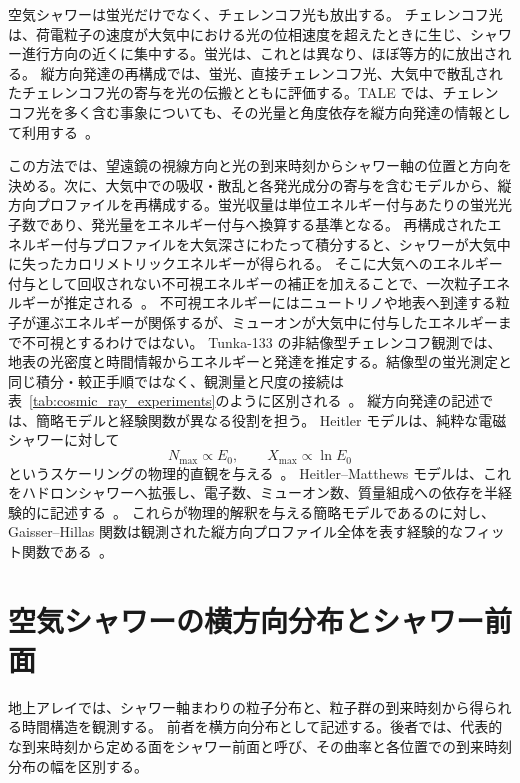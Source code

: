 \documentclass[book,paper=a4,fontsize=11pt]{jlreq}
\begin{document}
空気シャワーは蛍光だけでなく、チェレンコフ光も放出する。
チェレンコフ光は、荷電粒子の速度が大気中における光の位相速度を超えたときに生じ、シャワー進行方向の近くに集中する。蛍光は、これとは異なり、ほぼ等方的に放出される。
縦方向発達の再構成では、蛍光、直接チェレンコフ光、大気中で散乱されたチェレンコフ光の寄与を光の伝搬とともに評価する。TALE では、チェレンコフ光を多く含む事象についても、その光量と角度依存を縦方向発達の情報として利用する~\cite{TALESpectrum2018,TALEMassComposition2026}。

この方法では、望遠鏡の視線方向と光の到来時刻からシャワー軸の位置と方向を決める。次に、大気中での吸収・散乱と各発光成分の寄与を含むモデルから、縦方向プロファイルを再構成する。蛍光収量は単位エネルギー付与あたりの蛍光光子数であり、発光量をエネルギー付与へ換算する基準となる。
再構成されたエネルギー付与プロファイルを大気深さにわたって積分すると、シャワーが大気中に失ったカロリメトリックエネルギーが得られる。
そこに大気へのエネルギー付与として回収されない不可視エネルギーの補正を加えることで、一次粒子エネルギーが推定される~\cite{PDGCosmicRays,Stanev2004,TALEMassComposition2026}。
不可視エネルギーにはニュートリノや地表へ到達する粒子が運ぶエネルギーが関係するが、ミューオンが大気中に付与したエネルギーまで不可視とするわけではない。
Tunka-133 の非結像型チェレンコフ観測では、地表の光密度と時間情報からエネルギーと発達を推定する。結像型の蛍光測定と同じ積分・較正手順ではなく、観測量と尺度の接続は表~\ref{tab:cosmic_ray_experiments}のように区別される~\cite{TunkaSpectrum2020}。
縦方向発達の記述では、簡略モデルと経験関数が異なる役割を担う。
Heitler モデルは、純粋な電磁シャワーに対して
\begin{equation}
  N_{\max}\propto E_0,
  \qquad
  X_{\max}\propto \ln E_0
\end{equation}
というスケーリングの物理的直観を与える~\cite{Heitler1944,PDGCosmicRays}。
Heitler--Matthews モデルは、これをハドロンシャワーへ拡張し、電子数、ミューオン数、質量組成への依存を半経験的に記述する~\cite{Matthews2005,Montanus2013}。
これらが物理的解釈を与える簡略モデルであるのに対し、Gaisser--Hillas 関数は観測された縦方向プロファイル全体を表す経験的なフィット関数である~\cite{GaisserHillas1977}。
\section{空気シャワーの横方向分布とシャワー前面}\label{sec:lateral_structure}
地上アレイでは、シャワー軸まわりの粒子分布と、粒子群の到来時刻から得られる時間構造を観測する。
前者を横方向分布として記述する。後者では、代表的な到来時刻から定める面をシャワー前面と呼び、その曲率と各位置での到来時刻分布の幅を区別する。
\end{document}
